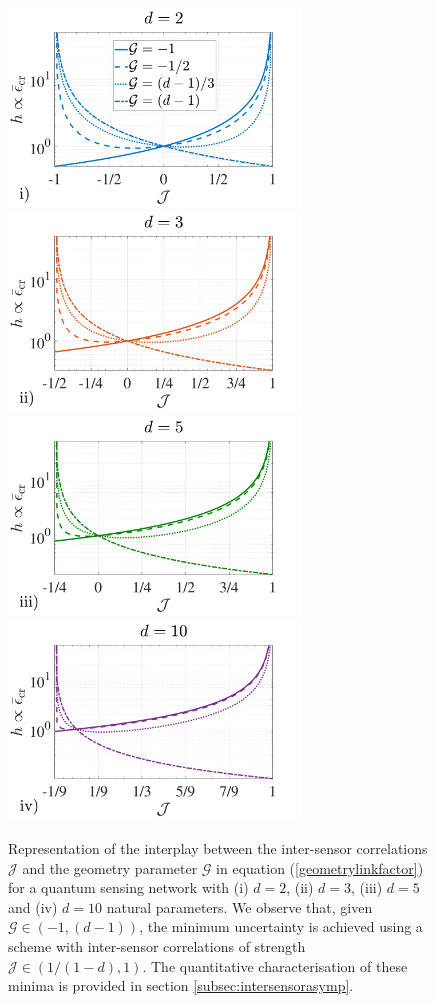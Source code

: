 \begin{figure}[t]
\centering
\includegraphics[trim={0cm 0.1cm 1.2cm 0cm},clip,width=7.75cm]{pictures/ch6_fig_extra_i}\includegraphics[trim={0cm 0.1cm 1.2cm 0cm},clip,width=7.75cm]{pictures/ch6_fig_extra_ii}
\includegraphics[trim={0cm 0.1cm 1.2cm 0cm},clip,width=7.75cm]{pictures/ch6_fig_extra_iii}\includegraphics[trim={0cm 0.1cm 1.2cm 0cm},clip,width=7.75cm]{pictures/ch6_fig_extra_iv}
	\caption[Asymptotic uncertainty, correlations and geometry of the functions]{Representation of the interplay between the inter-sensor correlations $\mathcal{J}$ and the geometry parameter $\mathcal{G}$ in equation (\ref{geometrylinkfactor}) for a quantum sensing network with (i) $d=2$, (ii) $d=3$, (iii) $d=5$ and (iv) $d=10$ natural parameters. We observe that, given $\mathcal{G} \in (-1, (d-1))$, the minimum uncertainty is achieved using a scheme with inter-sensor correlations of strength $\mathcal{J} \in (1/(1-d),1)$. The quantitative characterisation of these minima is provided in section \ref{subsec:intersensorasymp}.}
\label{geolinkplot}
\end{figure}


